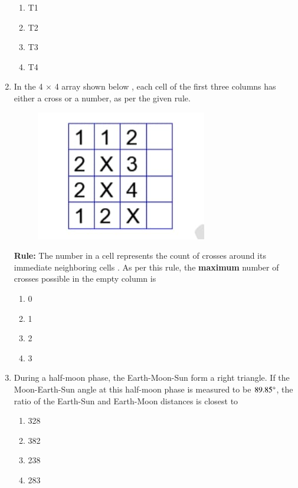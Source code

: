 \documentclass[journal,12pt,onecolumn]{article}
\theoremstyle{remark}
\begin{document}
\begin{enumerate}
    \hfill{}
    \begin{enumerate}
        \item T1
        \item T2
        \item T3
        \item T4
    \end{enumerate}

    \item In the 4 $\times$ 4 array shown below , each cell of the first three columns has either a cross  or a number, as per the given rule.
    \begin{figure}[H]
        \centering
        \includegraphics[width=0.25\columnwidth]{figs/1Q9.jpg}
        \caption{}
        \label{fig:q9}
    \end{figure}
    \textbf{Rule:} The number in a cell represents the count of crosses around its immediate neighboring cells .
    As per this rule, the \textbf{maximum} number of crosses possible in the empty column is

    \hfill{}
    \begin{enumerate}
        \item 0
        \item 1
        \item 2
        \item 3
    \end{enumerate}

    \item During a half-moon phase, the Earth-Moon-Sun form a right triangle. If the Moon-Earth-Sun angle at this half-moon phase is measured to be $89.85\degree$, the ratio of the Earth-Sun and Earth-Moon distances is closest to

    \hfill{}
    \begin{enumerate}
        \item 328
        \item 382
        \item 238
        \item 283
    \end{enumerate}


\end{enumerate}
\end{document}
